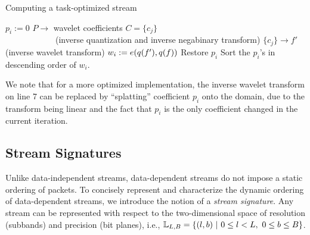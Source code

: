 \begin{algorithm}[h]
  \caption{Computing a task-optimized stream}
  \begin{algorithmic}[1]
			\State $p_i := 0$
      \State $P \rightarrow$ wavelet coefficients $C=\{c_j\}$\\
      		\ \ \ \ \ \ \ \ \ \ \ \ (inverse quantization and inverse negabinary transform)
			\State $\{c_j\} \rightarrow f'$ (inverse wavelet transform)
			\State $w_i := e(q(f'),q(f))$			
			\State Restore $p_i$
		\EndFor
		\State Sort the $p_i$'s in descending order of $w_i$.
	\end{algorithmic}
	\label{alg:greedy}
\end{algorithm}

\vspace{-1em}
We note that for a more optimized implementation, the inverse wavelet transform on line 7 can be
replaced by ``splatting'' coefficient $p_i$ onto the domain, due to the transform being linear and
the fact that $p_i$ is the only coefficient changed in the current iteration.

\subsection{Stream Signatures} \label{sec:stream-signature}

Unlike data-independent streams, data-dependent streams do not impose a static ordering of packets.
To concisely represent and characterize the dynamic ordering of data-dependent streams, we introduce
the notion of a \emph{stream signature}. Any stream can be represented with respect to the
two-dimensional space of resolution (subbands) and precision (bit
planes), i.e., \mbox{${\mathbb L}_{L,B}=\{(l,b)\ |\ 0\leq l < L,\ 0\leq b \leq B\}$.}

